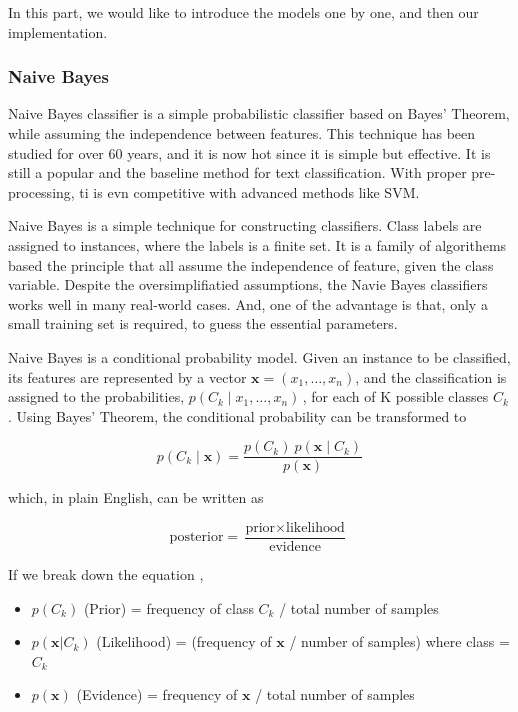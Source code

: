 \documentclass[12pt,a4paper]{report}
\begin{document}
      In this part, we would like to introduce the models one by one, and then our implementation.

      \subsubsection{Naive Bayes}
        Naive Bayes classifier is a simple probabilistic classifier based on Bayes' Theorem, while assuming the independence between features. This technique has been studied for over 60 years, and it is now hot since it is simple but effective. It is still a popular and the baseline method for text classification. With proper pre-processing, ti is evn competitive with advanced methods like SVM.

        Naive Bayes is a simple technique for constructing classifiers. Class labels are assigned to instances, where the labels is a finite set. It is a family of algorithems based the principle that all assume the independence of feature, given the class variable. Despite the oversimplifiatied assumptions, the Navie Bayes classifiers works well in many real-world cases. And, one of the advantage is that, only a small training set is required, to guess the essential parameters. \cite{wiki:naive_bayes_classifier}

        Naive Bayes is a conditional probability model. Given an instance to be classified, its features are represented by a vector $\mathbf{x} = (x_1, \dots, x_n)$, and the classification is assigned to the probabilities, $p(C_k \mid x_1, \dots, x_n)\,$, for each of K possible classes $C_k$. Using Bayes' Theorem, the conditional probability can be transformed to

        \[p(C_k \mid \mathbf{x}) = \frac{p(C_k) \ p(\mathbf{x} \mid C_k)}{p(\mathbf{x})} \]

        which, in plain English, can be written as

        \[
          \mbox{posterior} = \frac{\mbox{prior} \times \mbox{likelihood}}{\mbox{evidence}} \,
        \]

        If we break down the equation \cite{LT_2015},

        \begin{itemize}
          \item \(p(C_k) \) (Prior) = frequency of class $C_k$ / total number of samples
          \item $p(\mathbf{x} \vert C_k)$ (Likelihood) = (frequency of $\mathbf{x}$ / number of samples) where class = $C_k$
          \item $p(\mathbf{x})$ (Evidence) = frequency of $\mathbf{x}$ / total number of samples
        \end{itemize}
\end{document}
